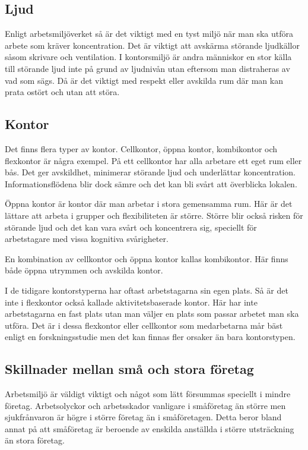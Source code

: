\subsection{Ljud}
Enligt arbetsmiljöverket så är det viktigt med en tyst miljö när man ska utföra arbete som kräver koncentration. Det är viktigt att avskärma störande ljudkällor såsom skrivare och ventilation. I kontorsmiljö är andra människor en stor källa till störande ljud inte på grund av ljudnivån utan eftersom man distraheras av vad som sägs. Då är det viktigt med respekt eller avskilda rum där man kan prata ostört och utan att störa. \cite{AVLjud}

\subsection{Kontor}
Det finns flera typer av kontor. Cellkontor, öppna kontor, kombikontor och flexkontor är några exempel. På ett cellkontor har alla arbetare ett eget rum eller bås. Det ger avskildhet, minimerar störande ljud och underlättar koncentration. Informationsflödena blir dock sämre och det kan bli svårt att överblicka lokalen.

Öppna kontor är kontor där man arbetar i stora gemensamma rum. Här är det lättare att arbeta i grupper och flexibiliteten är större. Större blir också risken för störande ljud och det kan vara svårt och koncentrera sig, speciellt för arbetstagare med vissa kognitiva svårigheter.

En kombination av cellkontor och öppna kontor kallas kombikontor. Här finns både öppna utrymmen och avskilda kontor.

I de tidigare kontorstyperna har oftast arbetstagarna sin egen plats. Så är det inte i flexkontor också kallade aktivitetsbaserade kontor. Här har inte arbetstagarna en fast plats utan man väljer en plats som passar arbetet man ska utföra. Det är i dessa flexkontor eller cellkontor som medarbetarna mår bäst enligt en forskningsstudie men det kan finnas fler orsaker än bara kontorstypen. \cite{AVKontor}

\subsection{Skillnader mellan små och stora företag}
Arbetsmiljö är väldigt viktigt och något som lätt försummas speciellt i mindre företag. Arbetsolyckor och arbetsskador vanligare i småföretag än större men sjukfrånvaron är högre i större företag än i småföretagen. Detta beror bland annat på att småföretag är beroende av enskilda anställda i större utsträckning än stora företag.\cite{smaforetag}


